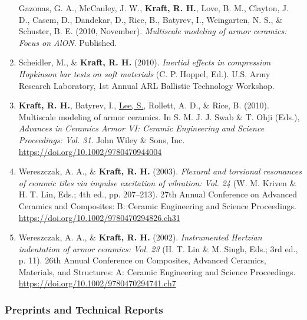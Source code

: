 \documentclass[11pt]{article}
\begin{document}
\begin{enumerate}
  Gazonas, G. 
A., McCauley, J. 
W., \textbf{\textbf{Kraft,} R. 
H.}, Love, B. 
M., Clayton,
  J. 
D., Casem, D., Dandekar, D., Rice, B., Batyrev, I., Weingarten, N.
  S., \& Schuster, B. 
E. 
(2010, November). 
\emph{Multiscale modeling of
  armor ceramics: Focus on AlON}. 
Published.
\item
  Scheidler, M., \& \textbf{\textbf{Kraft,} R. 
H.} (2010). 
\emph{Inertial effects in
  compression Hopkinson bar tests on soft materials} (C. 
P. 
Hoppel,
  Ed.). 
U.S. 
Army Research Laboratory, 1st Annual ARL Ballistic
  Technology Workshop.
\item
  \textbf{\textbf{Kraft,} R. 
H.}, Batyrev, I., \underline{Lee, S.}, Rollett, A. 
D., \& Rice, B.
  (2010). 
Multiscale modeling of armor ceramics. 
In S. 
M. 
J. 
J. 
Swab \&
  T. 
Ohji (Eds.), \emph{Advances in Ceramics Armor VI: Ceramic
  Engineering and Science Proceedings: Vol. 
31}. 
John Wiley \& Sons,
  Inc. 
\url{https://doi.org/10.1002/9780470944004}
\item
  Wereszczak, A. 
A., \& \textbf{\textbf{Kraft,} R. 
H.} (2003). 
\emph{Flexural and
  torsional resonances of ceramic tiles via impulse excitation of
  vibration: Vol. 
24} (W. 
M. 
Kriven \& H. 
T. 
Lin, Eds.; 4th ed., pp.
  207--213). 
27th Annual Conference on Advanced Ceramics and Composites:
  B: Ceramic Engineering and Science Proceedings.
  \url{https://doi.org/10.1002/9780470294826.ch31}
\item
  Wereszczak, A. 
A., \& \textbf{\textbf{Kraft,} R. 
H.} (2002). 
\emph{Instrumented Hertzian
  indentation of armor ceramics: Vol. 
23} (H. 
T. 
Lin \& M. 
Singh, Eds.;
  3rd ed., p. 
11). 
26th Annual Conference on Composites, Advanced
  Ceramics, Materials, and Structures: A: Ceramic Engineering and
  Science Proceedings. 
\url{https://doi.org/10.1002/9780470294741.ch7}
\end{enumerate}

\subsubsection{Preprints and Technical Reports}\label{other}
\end{document}
